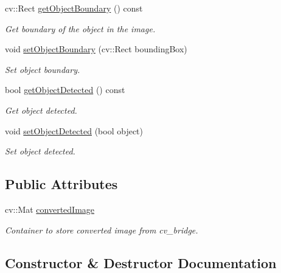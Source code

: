 \begin{DoxyCompactItemize}
cv\+::\+Rect \hyperlink{classObjectDetection_a897f179535427f66bc9f849b1daff904}{get\+Object\+Boundary} () const 
\begin{DoxyCompactList}\small\item\em Get boundary of the object in the image. \end{DoxyCompactList}\item 
void \hyperlink{classObjectDetection_af3c1adc86fa3950f0325e5c6de7c9a2e}{set\+Object\+Boundary} (cv\+::\+Rect bounding\+Box)
\begin{DoxyCompactList}\small\item\em Set object boundary. \end{DoxyCompactList}\item 
bool \hyperlink{classObjectDetection_ac1e795be46de92c3e7c2f050d805d601}{get\+Object\+Detected} () const 
\begin{DoxyCompactList}\small\item\em Get object detected. \end{DoxyCompactList}\item 
void \hyperlink{classObjectDetection_a1f0c0d87bb3fdc9082c8f4c450bbf1fb}{set\+Object\+Detected} (bool object)
\begin{DoxyCompactList}\small\item\em Set object detected. \end{DoxyCompactList}\end{DoxyCompactItemize}
\subsection*{Public Attributes}
\begin{DoxyCompactItemize}
\item 
cv\+::\+Mat \hyperlink{classObjectDetection_ab3a61dd408dd36da96f7398f14a1a054}{converted\+Image}
\begin{DoxyCompactList}\small\item\em Container to store converted image from cv\+\_\+bridge. \end{DoxyCompactList}\end{DoxyCompactItemize}


\subsection{Constructor \& Destructor Documentation}
